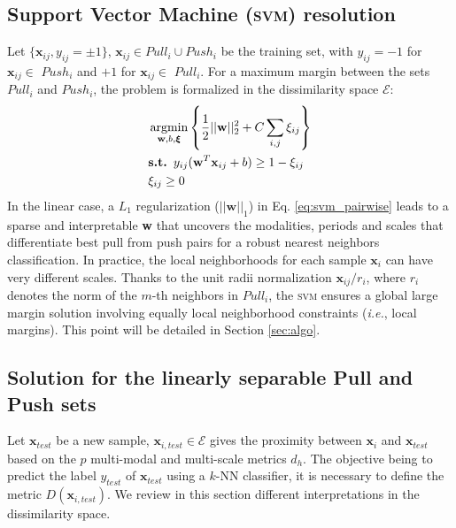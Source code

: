 \subsection{Support Vector Machine (\textsc{svm}) resolution}
\label{sec:svm_pairwise}
Let $\{\textbf{x}_{ij}, y_{ij} = \pm 1\}$, $\textbf{x}_{ij} \in Pull_i \cup Push_i$ be the training set, with $y_{ij} = -1$ for $\textbf{x}_{ij} \in$ $Push_i$ and $+1$ for $\textbf{x}_{ij} \in$ $Pull_i$. For a maximum margin between the sets $Pull_i$ and $Push_i$, the problem is formalized in the dissimilarity space $\mathcal{E}$:
\begin{equation}
	\begin{aligned}
	& \argmin_{\textbf{w},b,\boldsymbol{\xi}} \left\lbrace \frac{1}{2}||\textbf{w}||_2^2 + C \sum\limits_{i,j} \xi_{ij}\right\rbrace  \label{eq:svm_pairwise}\\
	&\textbf{s.t. } y_{ij}(\textbf{w}^T \textbf{x}_{ij} + b) \geq 1-\xi_{ij} \\
	&\xi_{ij} \geq 0
	\end{aligned}
\end{equation}
\noindent In the linear case, a $L_1$ regularization ($||\textbf{w}||_1$) in Eq. \ref{eq:svm_pairwise} leads to a sparse and interpretable \textbf{w} that uncovers the modalities, periods and scales that differentiate best pull from push pairs for a robust nearest neighbors classification.
In practice, the local neighborhoods for each sample $\textbf{x}_i$ can have very different scales. Thanks to the unit radii normalization $\textbf{x}_{ij}/r_i$, where $r_i$ denotes the norm of the $m$-th neighbors in $Pull_i$, the \textsc{svm} ensures a global large margin solution involving equally local neighborhood constraints (\textit{i.e.}, local margins). This point will be detailed in Section \ref{sec:algo}. \\


\subsection{Solution for the linearly separable Pull and Push sets}
Let $\textbf{x}_{test}$ be a new sample, $\textbf{x}_{i,test} \in \mathcal{E}$ gives the proximity between $\textbf{x}_{i}$ and $\textbf{x}_{test}$ based on the $p$ multi-modal and multi-scale metrics $d_h$. The objective being to predict the label $y_{test}$ of $\textbf{x}_{test}$ using a $k$-NN classifier, it is necessary to define the metric $D(\textbf{x}_{i,test})$. We review in this section different interpretations in the dissimilarity space. \\

